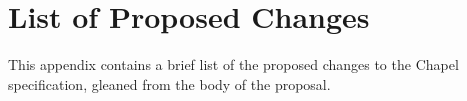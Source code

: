 \section{List of Proposed Changes}

This appendix contains a brief list of the proposed changes to the Chapel specification,
gleaned from the body of the proposal.

